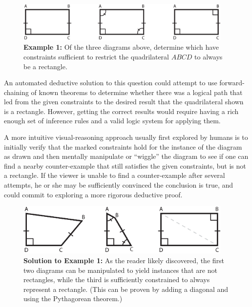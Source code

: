 \begin{figure}[h!]
\centering
\includegraphics[width=0.95\textwidth]{diagrams/rectangles.eps}
\captionsetup{labelformat=empty}
\caption{{\bf Example 1:} Of the three diagrams above, determine which
  have constraints sufficient to restrict the quadrilateral $ABCD$ to
  always be a rectangle.}
\end{figure}

An automated deductive solution to this question could attempt to use
forward-chaining of known theorems to determine whether there was a
logical path that led from the given constraints to the desired result
that the quadrilateral shown is a rectangle.  However, getting the
correct results would require having a rich enough set of inference
rules and a valid logic system for applying them.

A more intuitive visual-reasoning approach usually first explored by
humans is to initially verify that the marked constraints hold for the
instance of the diagram as drawn and then mentally manipulate or
``wiggle'' the diagram to see if one can find a nearby counter-example
that still satisfies the given constraints, but is not a rectangle.
If the viewer is unable to find a counter-example after several
attempts, he or she may be sufficiently convinced the conclusion is
true, and could commit to exploring a more rigorous deductive proof.

\newpage
\begin{figure}[h!]
\centering
\includegraphics[width=0.95\textwidth]{diagrams/rectangles-answer.eps}
\captionsetup{labelformat=empty}
\caption{{\bf Solution to Example 1:} As the reader likely discovered,
  the first two diagrams can be manipulated to yield instances that
  are not rectangles, while the third is sufficiently constrained to
  always represent a rectangle.  (This can be proven by adding a
  diagonal and using the Pythagorean theorem.)}
\end{figure}

